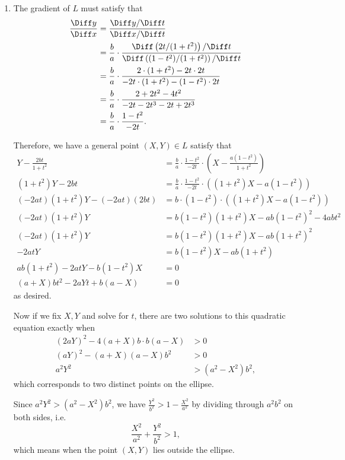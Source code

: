 \begin{enumerate}
    \item The gradient of \(L\) must satisfy that
    \begin{align*}
        \frac{\Diff y}{\Diff x} &= \frac{\Diff y / \Diff t}{\Diff x / \Diff t}\\
        &= \frac{b}{a} \cdot \frac{\Diff \left(2t/(1+t^2)\right) / \Diff t}{\Diff \left((1-t^2)/(1+t^2)\right) / \Diff t}\\
        &= \frac{b}{a} \cdot \frac{2 \cdot (1+t^2) - 2t \cdot 2t}{-2t \cdot (1+t^2) - (1-t^2) \cdot 2t}\\
        &= \frac{b}{a} \cdot \frac{2 + 2t^2 - 4t^2}{-2t - 2t^3 - 2t + 2t^3}\\
        &= \frac{b}{a} \cdot \frac{1 - t^2}{-2t}.
    \end{align*}

    Therefore, we have a general point \((X, Y) \in L\) satisfy that
    \begin{align*}
        Y - \frac{2bt}{1+t^2} &= \frac{b}{a} \cdot \frac{1 - t^2}{-2t} \cdot \left(X - \frac{a(1-t^2)}{1+t^2}\right)\\
        (1+t^2)Y - 2bt &= \frac{b}{a} \cdot \frac{1-t^2}{-2t} \cdot \left((1+t^2)X - a(1-t^2)\right)\\
        (-2at)(1+t^2)Y - (-2at)(2bt) &= b \cdot (1-t^2) \cdot \left((1+t^2)X - a(1-t^2)\right)\\
        (-2at)(1+t^2)Y &= b(1-t^2)(1+t^2)X - ab(1-t^2)^2 - 4abt^2\\
        (-2at)(1+t^2)Y &= b(1-t^2)(1+t^2)X - ab(1+t^2)^2\\
        -2atY &= b(1-t^2)X - ab(1+t^2)\\
        ab(1+t^2) -2atY - b(1-t^2)X &= 0\\
        (a + X)bt^2 - 2aYt + b(a-X) &= 0
    \end{align*}
    as desired.

    Now if we fix \(X, Y\) and solve for \(t\), there are two solutions to this quadratic equation exactly when
    \begin{align*}
        (2aY)^2 - 4(a+X)b \cdot b(a-X) &>0\\
        (aY)^2 - (a+X)(a-X)b^2 &>0\\
        a^2Y^2 &> (a^2-X^2)b^2,
    \end{align*}
    which corresponds to two distinct points on the ellipse.

    Since \(a^2 Y^2 > (a^2 - X^2) b^2\), we have \(\frac{Y^2}{b^2} > 1 - \frac{X^2}{a^2}\) by dividing through \(a^2 b^2\) on both sides, i.e.
    \[
        \frac{X^2}{a^2} + \frac{Y^2}{b^2} > 1,
    \]
    which means when the point \((X, Y)\) lies outside the ellipse.


\end{enumerate}
